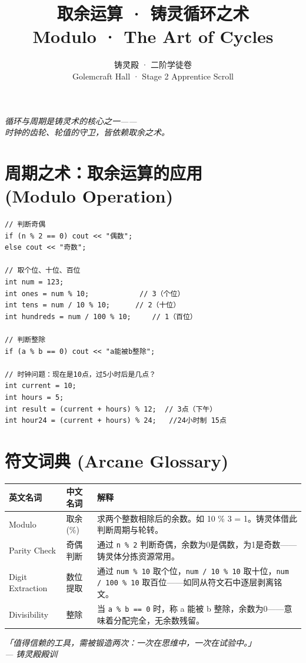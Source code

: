 \documentclass[UTF8,a4paper,12pt]{ctexart}
\title{取余运算 · 铸灵循环之术\\[4pt]
\large Modulo · The Art of Cycles}
\author{铸灵殿 · 二阶学徒卷\\[2pt]
\small Golemcraft Hall · Stage 2 Apprentice Scroll}
\date{}
\begin{document}
\maketitle

\begin{center}
\textit{循环与周期是铸灵术的核心之一——\\
时钟的齿轮、轮值的守卫，皆依赖取余之术。}
\end{center}

\vspace{0.5em}

\section*{周期之术：取余运算的应用 \\ (Modulo Operation)}

\begin{lstlisting}
// 判断奇偶
if (n % 2 == 0) cout << "偶数";
else cout << "奇数";

// 取个位、十位、百位
int num = 123;
int ones = num % 10;            // 3（个位）
int tens = num / 10 % 10;      // 2（十位）
int hundreds = num / 100 % 10;     // 1（百位）

// 判断整除
if (a % b == 0) cout << "a能被b整除";

// 时钟问题：现在是10点，过5小时后是几点？
int current = 10;
int hours = 5;
int result = (current + hours) % 12;  // 3点（下午）
int hour24 = (current + hours) % 24;   //24小时制 15点
\end{lstlisting}

\section*{符文词典 (Arcane Glossary)}

\begin{center}
\begin{tabular}{|l|l|p{10cm}|}
\hline
\textbf{英文名词} & \textbf{中文名词} & \textbf{解释} \\
\hline
Modulo & 取余 (\%) & 求两个整数相除后的余数。如 10 \% 3 = 1。铸灵体借此判断周期与轮转。 \\
\hline
Parity Check & 奇偶判断 & 通过 \texttt{n \% 2} 判断奇偶，余数为0是偶数，为1是奇数——铸灵体分拣资源常用。 \\
\hline
Digit Extraction & 数位提取 & 通过 \texttt{num \% 10} 取个位，\texttt{num / 10 \% 10} 取十位，\texttt{num / 100 \% 10} 取百位——如同从符文石中逐层剥离铭文。 \\
\hline
Divisibility & 整除 & 当 \texttt{a \% b == 0} 时，称 a 能被 b 整除，余数为0——意味着分配完全，无余数残留。 \\
\hline
\end{tabular}
\end{center}

\vfill
\begin{center}
\textit{「值得信赖的工具，需被锻造两次：一次在思维中，一次在试验中。」\\
--- 铸灵殿殿训}
\end{center}
\end{document}
